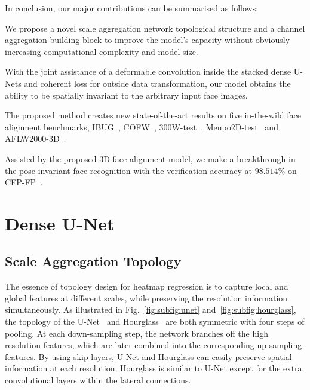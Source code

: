\documentclass{bmvc2k}
\newenvironment{tight_itemize}{
\begin{itemize}[leftmargin=20pt]
  \setlength{\topsep}{0pt}
  \setlength{\itemsep}{0pt}
  \setlength{\parskip}{0pt}
  \setlength{\parsep}{0pt}
}{\end{itemize}}
\begin{document}
In conclusion, our major contributions can be summarised as follows:
\vspace{-0.2cm}
\begin{tight_itemize}
\item We propose a novel scale aggregation network topological structure and a channel aggregation building block to improve the model's capacity without obviously increasing computational complexity and model size.
\item With the joint assistance of a deformable convolution inside the stacked dense U-Nets and coherent loss for outside data transformation, our model obtains the ability to be spatially invariant to the arbitrary input face images. 
\item The proposed method creates new state-of-the-art results on five in-the-wild face alignment benchmarks, IBUG~\cite{sagonas2016300}, COFW~\cite{burgos2013robust,ghiasi2015occlusion}, 300W-test~\cite{sagonas2016300}, Menpo2D-test~\cite{stefanos2017menpo} and AFLW2000-3D~\cite{zhu2016face}.
\item Assisted by the proposed 3D face alignment model, we make a breakthrough in the pose-invariant face recognition with the verification accuracy at $98.514\%$ on CFP-FP~\cite{sengupta2016frontal}.
\end{tight_itemize}

\section{Dense U-Net}



\subsection{Scale Aggregation Topology}

The essence of topology design for heatmap regression is to capture local and global features at different scales, while preserving the resolution information simultaneously. As illustrated in Fig.~\ref{fig:subfig:unet} and~\ref{fig:subfig:hourglass}, the topology of the U-Net~\cite{ronneberger2015u} and Hourglass~\cite{newell2016stacked} are both symmetric with four steps of pooling. At each down-sampling step, the network branches off the high resolution features, which are later combined into the corresponding up-sampling features. By using skip layers, U-Net and Hourglass can easily preserve spatial information at each resolution. Hourglass is similar to U-Net except for the extra convolutional layers within the lateral connections.
\end{document}
